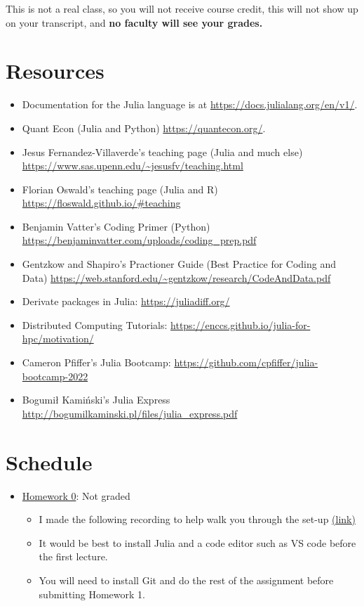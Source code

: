 \documentclass[
]{book}
\providecommand{\tightlist}{%
  \setlength{\itemsep}{0pt}\setlength{\parskip}{0pt}}
\begin{document}
This is not a real class, so you will not receive course credit, this will not show up on your transcript, and \textbf{no faculty will see your grades.}

\hypertarget{resources}{%
\section{Resources}\label{resources}}

\begin{itemize}
\tightlist
\item
  Documentation for the Julia language is at \url{https://docs.julialang.org/en/v1/}.
\item
  Quant Econ (Julia and Python) \url{https://quantecon.org/}.
\item
  Jesus Fernandez-Villaverde's teaching page (Julia and much else) \url{https://www.sas.upenn.edu/~jesusfv/teaching.html}
\item
  Florian Oswald's teaching page (Julia and R) \url{https://floswald.github.io/\#teaching}
\item
  Benjamin Vatter's Coding Primer (Python) \url{https://benjaminvatter.com/uploads/coding_prep.pdf}
\item
  Gentzkow and Shapiro's Practioner Guide (Best Practice for Coding and Data) \url{https://web.stanford.edu/~gentzkow/research/CodeAndData.pdf}
\item
  Derivate packages in Julia: \url{https://juliadiff.org/}
\item
  Distributed Computing Tutorials: \url{https://enccs.github.io/julia-for-hpc/motivation/}
\item
  Cameron Pfiffer's Julia Bootcamp: \url{https://github.com/cpfiffer/julia-bootcamp-2022}
\item
  Bogumił Kamiński's Julia Express \url{http://bogumilkaminski.pl/files/julia_express.pdf}
\end{itemize}

\hypertarget{schedule}{%
\section{Schedule}\label{schedule}}

\begin{itemize}
\tightlist
\item
  \href{https://kevinghunt.github.io/ComputationCamp/homeworks/homework0.html}{Homework 0}: Not graded

  \begin{itemize}
  \tightlist
  \item
    I made the following recording to help walk you through the set-up \href{https://uwmadison.zoom.us/rec/share/SbHWe_IMXFEaNy6ujwbKphJ2r3TgOvHtJqpkHT17NZDpX7cXcMdZhQtfmoC-WGNI.iN1B20YE_uH-QuFT?startTime=1690209565000}{(link)}
  \item
    It would be best to install Julia and a code editor such as VS code before the first lecture.
  \item
    You will need to install Git and do the rest of the assignment before submitting Homework 1.
  \end{itemize}
\end{itemize}
\end{document}
